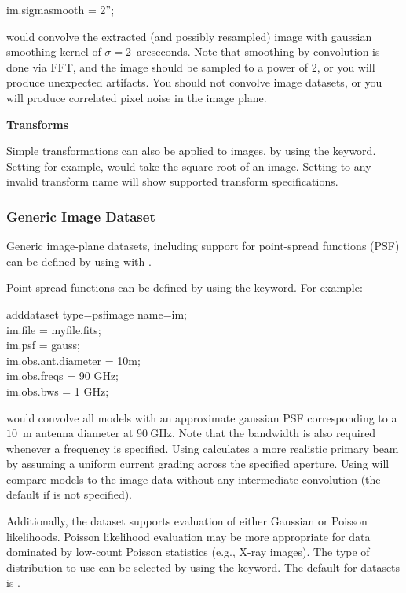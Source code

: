 \begin{myindentpar}{3cm}
im.sigmasmooth = 2'';
\end{myindentpar}

would convolve the extracted (and possibly resampled) image with
gaussian smoothing kernel of $\sigma = 2$~arcseconds.  Note that
smoothing by convolution is done via FFT, and the image should be
sampled to a power of 2, or you will produce unexpected artifacts.
You should not convolve image datasets, or you will produce correlated
pixel noise in the image plane.

{\bf Transforms}

Simple transformations can also be applied to images, by using the
 keyword.  Setting  for example,
would take the square root of an image.  Setting  to any
invalid transform name will show supported transform specifications.

\subsubsection{Generic Image Dataset}

Generic image-plane datasets, including support for point-spread
functions (PSF) can be defined by using  with
.

Point-spread functions can be defined by using the  keyword.  For example:

\begin{myindentpar}{3cm}
adddataset type=psfimage name=im;\\
im.file = myfile.fits;\\
im.psf = gauss;\\
im.obs.ant.diameter = 10m;\\
im.obs.freqs = 90 GHz;\\
im.obs.bws = 1 GHz;
\end{myindentpar}

would convolve all models with an approximate gaussian PSF
corresponding to a $10$~m antenna diameter at $90~$GHz.  Note that the
bandwidth is also required whenever a frequency is specified.  Using
 calculates a more realistic primary beam by
assuming a uniform current grading across the specified aperture.
Using  will compare models to the image data without
any intermediate convolution (the default if  is not
specified).

Additionally, the  dataset supports evaluation of
either Gaussian or Poisson likelihoods.  Poisson likelihood evaluation
may be more appropriate for data dominated by low-count Poisson
statistics (e.g., X-ray images).  The type of distribution to use can
be selected by using the  keyword.  The default for
 datasets is .

